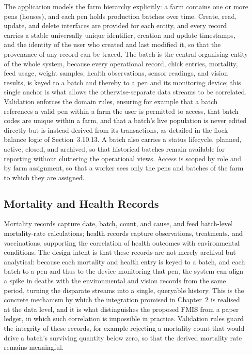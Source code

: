 \documentclass[12pt,a4paper]{report}
\begin{document}
The application models the farm hierarchy explicitly: a farm contains one or more pens (houses), and each pen holds production batches over time. Create, read, update, and delete interfaces are provided for each entity, and every record carries a stable universally unique identifier, creation and update timestamps, and the identity of the user who created and last modified it, so that the provenance of any record can be traced. The batch is the central organising entity of the whole system, because every operational record, chick entries, mortality, feed usage, weight samples, health observations, sensor readings, and vision results, is keyed to a batch and thereby to a pen and its monitoring device; this single anchor is what allows the otherwise-separate data streams to be correlated. Validation enforces the domain rules, ensuring for example that a batch references a valid pen within a farm the user is permitted to access, that batch codes are unique within a farm, and that a batch's live population is never edited directly but is instead derived from its transactions, as detailed in the flock-balance logic of Section~3.10.13. A batch also carries a status lifecycle, planned, active, closed, and archived, so that historical batches remain available for reporting without cluttering the operational views. Access is scoped by role and by farm assignment, so that a worker sees only the pens and batches of the farm to which they are assigned.

\subsection{Mortality and Health Records}

Mortality records capture date, batch, count, and cause, and feed batch-level mortality-rate calculations; health records capture observations, treatments, and vaccinations, supporting the correlation of health outcomes with environmental conditions. The design intent is that these records are not merely archival but analytical: because each mortality and health entry is keyed to a batch, and each batch to a pen and thus to the device monitoring that pen, the system can align a spike in deaths with the environmental and vision records from the same period, turning the disparate streams into a single, queryable history. This is the concrete mechanism by which the integration promised in Chapter~2 is realised at the data level, and it is what distinguishes the proposed FMIS from a paper ledger, in which such correlation is impossible in practice. Validation rules guard the integrity of these records, for example rejecting a mortality count that would drive a batch's surviving quantity below zero, so that the derived mortality rate remains meaningful.
\end{document}
